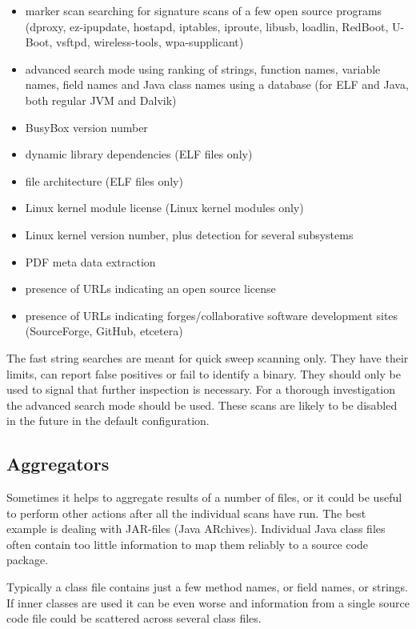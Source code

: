 \documentclass[10pt,a4paper]{article}
\begin{document}
\begin{itemize}
\item marker scan searching for signature scans of a few open source programs
(dproxy, ez-ipupdate, hostapd, iptables, iproute, libusb, loadlin, RedBoot,
U-Boot, vsftpd, wireless-tools, wpa-supplicant)
\item advanced search mode using ranking of strings, function names, variable
names, field names and Java class names using a database (for ELF and Java,
both regular JVM and Dalvik)
\item BusyBox version number
\item dynamic library dependencies (ELF files only)
\item file architecture (ELF files only)
\item Linux kernel module license (Linux kernel modules only)
\item Linux kernel version number, plus detection for several subsystems
\item PDF meta data extraction
\item presence of URLs indicating an open source license
\item presence of URLs indicating forges/collaborative software development
sites (SourceForge, GitHub, etcetera)
\end{itemize}

The fast string searches are meant for quick sweep scanning only. They have
their limits, can report false positives or fail to identify a binary. They
should only be used to signal that further inspection is necessary. For a
thorough investigation the advanced search mode should be used. These scans are
likely to be disabled in the future in the default configuration.

\subsection{Aggregators}

Sometimes it helps to aggregate results of a number of files, or it could be
useful to perform other actions after all the individual scans have run. The
best example is dealing with JAR-files (Java ARchives). Individual Java class
files often contain too little information to map them reliably to a source
code package.

Typically a class file contains just a few method names, or field names, or
strings. If inner classes are used it can be even worse and information from a
single source code file could be scattered across several class files.
\end{document}
